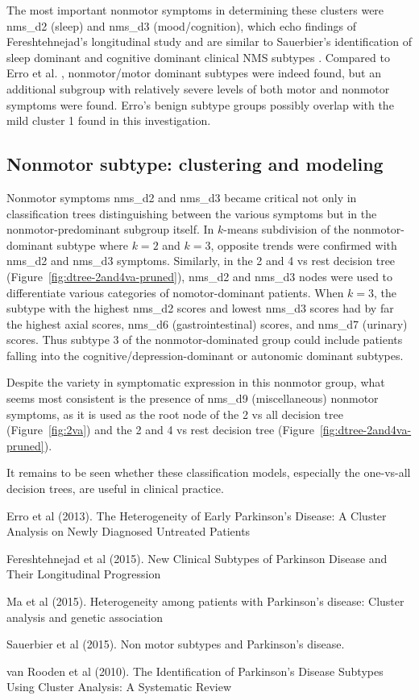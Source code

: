 \documentclass[10pt]{article}
\begin{document}
The most important nonmotor symptoms in determining these clusters were nms\_d2
(sleep) and nms\_d3 (mood/cognition), which echo findings of Fereshtehnejad's
longitudinal study \cite{fereshtehnejad15} and are similar to Sauerbier's
identification of sleep dominant and cognitive dominant clinical NMS subtypes
\cite{sauerbier15}. Compared to Erro et al. \cite{erro13}, nonmotor/motor
dominant subtypes were indeed found, but an additional subgroup with relatively
severe levels of both motor and nonmotor symptoms were found. Erro's benign
subtype groups possibly overlap with the mild cluster 1 found in this
investigation.

\subsection{Nonmotor subtype: clustering and modeling}
Nonmotor symptoms nms\_d2 and nms\_d3 became critical not only in
classification trees distinguishing between the various symptoms but in the
nonmotor-predominant subgroup itself. In $k$-means subdivision of the
nonmotor-dominant subtype where $k = 2$ and $k = 3$, opposite trends were
confirmed with nms\_d2 and nms\_d3 symptoms. Similarly, in the 2 and 4 vs rest
decision tree (Figure~\ref{fig:dtree-2and4va-pruned}), nms\_d2 and nms\_d3 nodes were
used to differentiate various categories of nomotor-dominant patients.
When $k = 3$, the subtype with the highest nms\_d2 scores and lowest
nms\_d3 scores had by far the highest axial scores, nms\_d6 (gastrointestinal)
scores, and nms\_d7 (urinary) scores. Thus subtype 3 of the nonmotor-dominated
group could include patients falling into the cognitive/depression-dominant or
autonomic dominant subtypes.

Despite the variety in symptomatic expression in this nonmotor group, what
seems most consistent is the presence of nms\_d9 (miscellaneous) nonmotor
symptoms, as it is used as the root node of the 2 vs all decision tree
(Figure~\ref{fig:2va}) and the 2 and 4 vs rest decision tree
(Figure~\ref{fig:dtree-2and4va-pruned}).

It remains to be seen whether these classification models, especially the
one-vs-all decision trees, are useful in clinical practice.

\begin{thebibliography}{9}

Erro et al (2013). The Heterogeneity of Early Parkinson’s Disease: A Cluster
Analysis on Newly Diagnosed Untreated Patients

Fereshtehnejad et al (2015). New Clinical Subtypes of Parkinson
Disease and Their Longitudinal Progression

Ma et al (2015). Heterogeneity among patients with Parkinson's disease: Cluster
analysis and genetic association

Sauerbier et al (2015). Non motor subtypes and Parkinson's disease.

van Rooden et al (2010). The Identification of Parkinson's Disease Subtypes
Using Cluster Analysis: A Systematic Review

\end{thebibliography}
\end{document}
